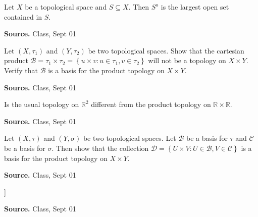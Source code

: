 \documentclass[12pt,twoside]{report}
\newenvironment*{source}{\hfill\scriptsize\textbf{Source.}\space}{\par}
\begin{document}
\begin{samepage}
\begin{ex}
Let $X$ be a topological space and $S \subseteq X$. Then $S ^\mathrm{o}$ is the largest open set contained in $S$.
\end{ex}
\begin{source}
Class, Sept 01
\end{source}
\end{samepage}

\begin{samepage}
\begin{ex}
Let $\left (X, \tau_1\right )$ and $\left (Y, \tau_2\right )$ be two topological spaces. Show that the cartesian product $\mathcal{B} = \tau_1 \times \tau_2 = \left\{ u \times v  :  u \in \tau_1, v \in \tau_2 \right\}$ will not be a topology on $X \times Y$.
Verify that $\mathcal{B}$ is a basis for the product topology on $X \times Y$.
\end{ex}
\begin{source}
Class, Sept 01
\end{source}
\end{samepage}

\begin{samepage}
\begin{ex}
Is the usual topology on $\mathbb{R} ^2$ different from the product topology on $\mathbb{R} \times \mathbb{R}$.
\end{ex}
\begin{source}
Class, Sept 01
\end{source}
\end{samepage}

\begin{samepage}
\begin{ex}
Let $\left (X, \tau\right )$ and $\left (Y, \sigma\right )$ be two topological spaces. Let $\mathcal{B}$ be a basis for $\tau$ and $\mathcal{C}$ be a basis for $\sigma$. 
Then show that the collection $\mathcal{D} = \left\{ U \times V  :  U \in \mathcal{B}, V \in \mathcal{C} \right\}$ is a basis for the product topology on
 $X \times Y$.
\end{ex}
\begin{source}
Class, Sept 01
\end{source}
\end{samepage}

\begin{samepage}
\begin{ex}
[[Stub for projection maps and one theorem (before axiom of choice) ]]
\end{ex}
\begin{source}
Class, Sept 01
\end{source}
\end{samepage}
\end{document}
